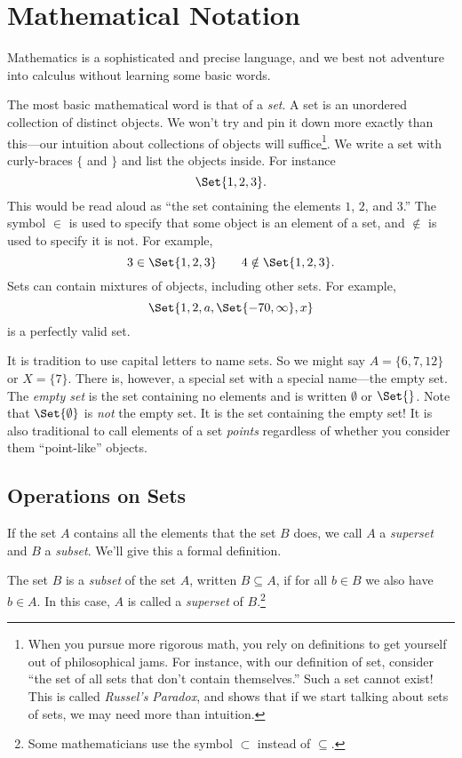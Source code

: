 \newpage
\section{Mathematical Notation}
	Mathematics is a sophisticated and precise language, and
	we best not adventure into calculus without learning some
	basic words.

	The most basic mathematical word is that of a \emph{set}.  
	A set is an unordered collection of distinct objects.  We won't try and pin
	it down more exactly than this---our intuition about collections
	of objects will suffice\footnote{ When you pursue more rigorous math,
	you rely on definitions to get yourself out of philosophical jams.  For instance,
	with our definition of set, consider ``the set of all sets that don't
	contain themselves.''  Such a set cannot exist!
	This is called \emph{Russel's Paradox}, and shows
	that if we start talking about sets of sets, we may need more than
	intuition.}. We write a set with curly-braces $\{$ and $\}$ and
	list the objects inside.  For instance
	\[
		\Set{1,2,3}.
	\]
	This would be read aloud as ``the set containing the elements $1$, $2$, and $3$.''
	The symbol $\in$\index{$\in$} is used to specify that some object is an element of a set, and
	$\notin$ is used to specify it is not.  For example,
	\[
		3\in\Set{1,2,3}\qquad 4\notin\Set{1,2,3}.
	\]
	Sets can contain mixtures of objects, including other sets.  For example,
	\[
		\Set{1,2,a,\Set{-70,\infty}, x}
	\]
	is a perfectly valid set.

	It is tradition to use capital letters to name sets.  So we might say $A=\{6,7,12\}$
	or $X=\{7\}$.  There is, however, a special set with a special name---the
	empty set.  The \emph{empty set} is the set containing no elements
	and is written $\emptyset$ or $\Set{}$.  Note that $\Set{\emptyset}$ is \emph{not}
	the empty set.  It is the set containing the empty set!  It is also traditional
	to call elements of a set \emph{points} regardless of whether you
	consider them ``point-like'' objects.

	\subsection{Operations on Sets}
	If the set $A$ contains all the elements that the set $B$ does, we call $A$ a \emph{superset}
	and $B$ a \emph{subset}.  We'll give this a formal
	definition.
	\begin{definition}
		The set $B$ is a \emph{subset} of the set $A$, written $B\subseteq A$, if for all
		$b\in B$ we also have $b\in A$.  In this case, $A$ is called a \emph{superset}
		of $B$.\footnote{
			Some mathematicians use the symbol $\subset$ instead of $\subseteq$.}
	\end{definition}

